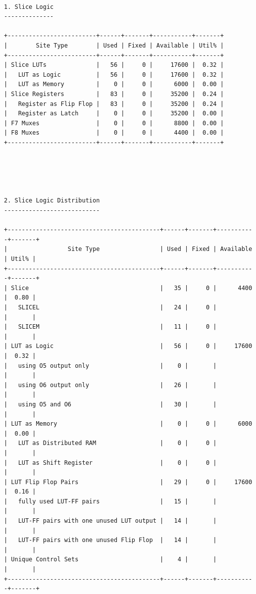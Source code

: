\documentclass[12pt, a4paper]{article}
\begin{document}
\begin{Verbatim}

1. Slice Logic
--------------

+-------------------------+------+-------+-----------+-------+
|        Site Type        | Used | Fixed | Available | Util% |
+-------------------------+------+-------+-----------+-------+
| Slice LUTs              |   56 |     0 |     17600 |  0.32 |
|   LUT as Logic          |   56 |     0 |     17600 |  0.32 |
|   LUT as Memory         |    0 |     0 |      6000 |  0.00 |
| Slice Registers         |   83 |     0 |     35200 |  0.24 |
|   Register as Flip Flop |   83 |     0 |     35200 |  0.24 |
|   Register as Latch     |    0 |     0 |     35200 |  0.00 |
| F7 Muxes                |    0 |     0 |      8800 |  0.00 |
| F8 Muxes                |    0 |     0 |      4400 |  0.00 |
+-------------------------+------+-------+-----------+-------+





2. Slice Logic Distribution
---------------------------

+-------------------------------------------+------+-------+-----------+-------+
|                 Site Type                 | Used | Fixed | Available | Util% |
+-------------------------------------------+------+-------+-----------+-------+
| Slice                                     |   35 |     0 |      4400 |  0.80 |
|   SLICEL                                  |   24 |     0 |           |       |
|   SLICEM                                  |   11 |     0 |           |       |
| LUT as Logic                              |   56 |     0 |     17600 |  0.32 |
|   using O5 output only                    |    0 |       |           |       |
|   using O6 output only                    |   26 |       |           |       |
|   using O5 and O6                         |   30 |       |           |       |
| LUT as Memory                             |    0 |     0 |      6000 |  0.00 |
|   LUT as Distributed RAM                  |    0 |     0 |           |       |
|   LUT as Shift Register                   |    0 |     0 |           |       |
| LUT Flip Flop Pairs                       |   29 |     0 |     17600 |  0.16 |
|   fully used LUT-FF pairs                 |   15 |       |           |       |
|   LUT-FF pairs with one unused LUT output |   14 |       |           |       |
|   LUT-FF pairs with one unused Flip Flop  |   14 |       |           |       |
| Unique Control Sets                       |    4 |       |           |       |
+-------------------------------------------+------+-------+-----------+-------+

\end{Verbatim}
\end{document}

